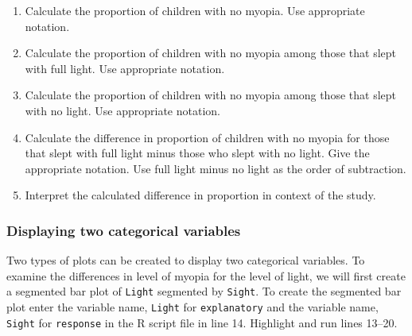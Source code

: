 \documentclass[
]{report}
\begin{document}
\begin{enumerate}
\def\labelenumi{\arabic{enumi}.}
\setcounter{enumi}{3}
\item
  Calculate the proportion of children with no myopia. Use appropriate notation.
  \vspace{0.3in}
\item
  Calculate the proportion of children with no myopia among those that slept with full light. Use appropriate notation.
  \vspace{0.3in}
\item
  Calculate the proportion of children with no myopia among those that slept with no light. Use appropriate notation.
  \vspace{0.3in}
\item
  Calculate the difference in proportion of children with no myopia for those that slept with full light minus those who slept with no light. Give the appropriate notation. Use full light minus no light as the order of subtraction.
  \vspace{0.8in}
\item
  Interpret the calculated difference in proportion in context of the study.
\end{enumerate}

\vspace{1in}

\subsubsection*{Displaying two categorical variables}\label{displaying-two-categorical-variables}

Two types of plots can be created to display two categorical variables. To examine the differences in level of myopia for the level of light, we will first create a segmented bar plot of \texttt{Light} segmented by \texttt{Sight}. To create the segmented bar plot enter the variable name, \texttt{Light} for \texttt{explanatory} and the variable name, \texttt{Sight} for \texttt{response} in the R script file in line 14. Highlight and run lines 13--20.
\end{document}
